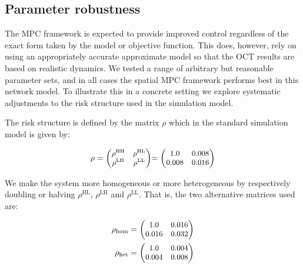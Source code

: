 \subsection{Parameter robustness\label{sec:ch4:Results_ParameterRobustness}}

The MPC framework is expected to provide improved control regardless of the exact form taken by the model or objective function. This does, however, rely on using an appropriately accurate approximate model so that the OCT results are based on realistic dynamics. We tested a range of arbitrary but reasonable parameter sets, and in all cases the spatial MPC framework performs best in this network model. To illustrate this in a concrete setting we explore systematic adjustments to the risk structure used in the simulation model.

The risk structure is defined by the matrix $\rho$ which in the standard simulation model is given by:
\begin{linenomath*}
    \begin{equation}
        \begin{alignedat}{3}
            \rho &= \small{\begin{pmatrix}
                \rho^{\mathrm{HH}}& \rho^{\mathrm{HL}}\\
                \rho^{\mathrm{LH}}& \rho^{\mathrm{LL}}
                \end{pmatrix}} &= \small{\begin{pmatrix}
                \num{1.0}& \num{0.008}\\
                \num{0.008}& \num{0.016}
            \end{pmatrix}}
        \end{alignedat}
    \end{equation}
\end{linenomath*}
We make the system more homogeneous or more heterogeneous by respectively doubling or halving $\rho^{\mathrm{HL}}$, $\rho^{\mathrm{LH}}$ and $\rho^{\mathrm{LL}}$. That is, the two alternative matrices used are:
\begin{linenomath*}
\begin{equation}
    \begin{alignedat}{2}
        \rho_{\mathrm{hom}} &= \small{\begin{pmatrix}
            \num{1.0}& \num{0.016}\\
            \num{0.016}& \num{0.032}
        \end{pmatrix}} \\
        \rho_{\mathrm{het}} &= \small{\begin{pmatrix}
            \num{1.0}& \num{0.004}\\
            \num{0.004}& \num{0.008}
        \end{pmatrix}}
    \end{alignedat}
\end{equation}
\end{linenomath*}
